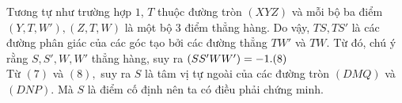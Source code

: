 \begin{bt}
{{}
		\noindent Tương tự như trường hợp $1$, $T$ thuộc đường tròn $(XYZ)$ và mỗi bộ ba điểm $(Y,T,W'),(Z,T,W)$ là một bộ $3$ điểm thẳng hàng.
		Do vậy, $TS, TS'$ là các đường phân giác của các góc tạo bởi các đường thẳng $TW'$ và $TW.$
		Từ đó, chú ý rằng $S,S',W,W'$ thẳng hàng, suy ra $(SS'WW')=-1. \hfill (8)$\\
		Từ $(7)$ và $(8),$ suy ra $S$ là tâm vị tự ngoài của các đường tròn $(DMQ)$ và $(DNP).$
		Mà $S$ là điểm cố định nên ta có điều phải chứng minh.
	}
\end{bt}
